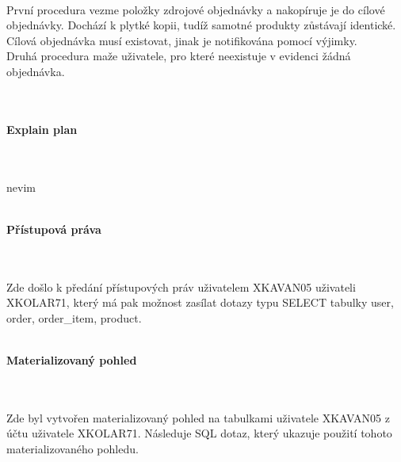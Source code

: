 \documentclass[12pt,a4paper]{article}
\begin{document}
	\\
	První procedura vezme položky zdrojové objednávky a nakopíruje je do cílové objednávky. Dochází k plytké kopii, tudíž samotné produkty zůstávají identické. Cílová objednávka musí existovat, jinak je notifikována pomocí výjimky. \\
Druhá procedura maže uživatele, pro které neexistuje v evidenci žádná objednávka. \\
	\\
	\\
	\noindent \begin{Large} \textbf{{Explain plan}} \end{Large} \\
	\\
	nevim
	\\
	\\
	\noindent \begin{Large} \textbf{{Přístupová práva}} \end{Large} \\
	\\
	Zde došlo k předání přístupových práv uživatelem XKAVAN05 uživateli XKOLAR71, který má pak možnost zasílat dotazy typu SELECT tabulky user, order, order\_item, product.
	\\
	\\
	\noindent \begin{Large} \textbf{{Materializovaný pohled}} \end{Large} \\
	\\
	Zde byl vytvořen materializovaný pohled na tabulkami uživatele XKAVAN05 z účtu uživatele XKOLAR71. Následuje SQL dotaz, který ukazuje použití tohoto materializovaného pohledu.
	\\
	\\
	

	
	
\end{document}
